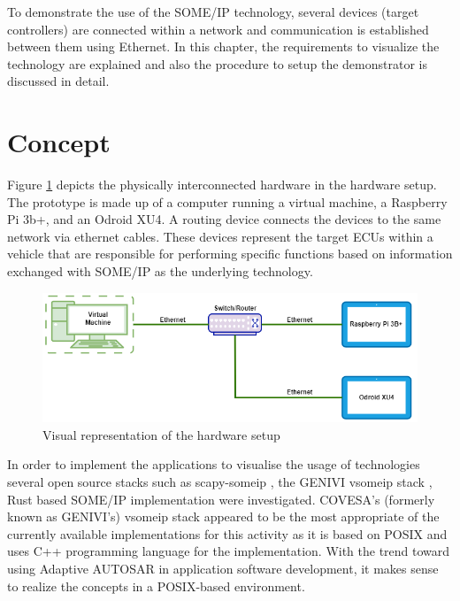 To demonstrate the use of the SOME/IP technology, several devices (target controllers) are connected within a network and communication is established between them using Ethernet. In this chapter, the requirements to visualize the technology are explained and also the procedure to setup the demonstrator is discussed in detail. 

\section{Concept}
Figure \ref{fig:Visual_representation_of_hardware_setup} depicts the physically interconnected hardware in the hardware setup. The prototype is made up of a computer running a virtual machine, a Raspberry Pi 3b+, and an Odroid XU4. A routing device connects the devices to the same network via ethernet cables. These devices represent the target ECUs within a vehicle that are responsible for performing specific functions based on information exchanged with SOME/IP as the underlying technology.

\begin{figure}[!htb]
	\centering
		\includegraphics[width=1\textwidth]{images/Visual_representation_of_hardware_setup.png}
	\caption{Visual representation of the hardware setup}
	\label{fig:Visual_representation_of_hardware_setup}
\end{figure}
\par In order to implement the applications to visualise the usage of technologies several open source stacks such as scapy-someip \cite{scapy_someip}, the GENIVI vsomeip stack  \cite{b_genivi_vsomeip}, Rust based SOME/IP implementation \cite{rust_someip} were investigated. COVESA's (formerly known as GENIVI's) vsomeip stack appeared to be the most appropriate of the currently available implementations for this activity as it is based on POSIX and uses C++ programming language for the implementation. With the trend toward using Adaptive AUTOSAR\cite{b_adaptive_platform} in application software development, it makes sense to realize the concepts in a POSIX-based environment. 
 
